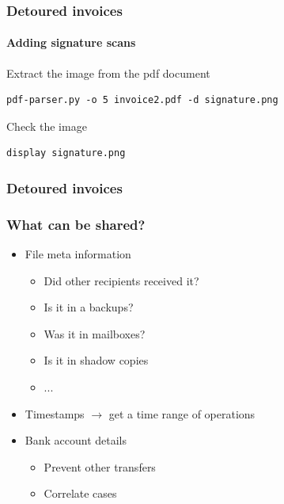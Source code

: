 \begin{frame}[fragile]
    \frametitle{Detoured invoices}
    \framesubtitle{Adding signature scans}

Extract the image from the pdf document

\begin{lstlisting}
pdf-parser.py -o 5 invoice2.pdf -d signature.png
\end{lstlisting}

Check the image

\begin{lstlisting}
display signature.png
\end{lstlisting}


\end{frame}

\begin{frame}
    \frametitle{Detoured invoices}
    \frametitle{What can be shared?}
    \begin{itemize}
        \item  File meta information
            \begin{itemize}
                \item Did other recipients received it?
                \item Is it in a backups?
                \item Was it in mailboxes?
                \item Is it in shadow copies
                \item ...
            \end{itemize}
        \item Timestamps $\to$ get a time range of operations
        \item Bank account details
        \begin{itemize}
            \item Prevent other transfers
            \item Correlate cases
        \end{itemize}
    \end{itemize}
\end{frame}
\small

